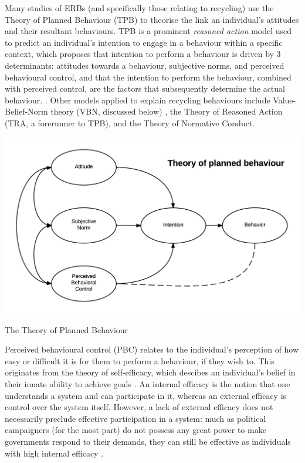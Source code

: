 \documentclass[nofonts,nols,justified,nobib]{tufte-book}
\begin{document}
Many studies of ERBs (and specifically those relating to recycling) use the Theory of Planned Behaviour (TPB) to theorise the link an individual's attitudes and their resultant behaviours. TPB is a prominent \emph{reasoned action} model used to predict an individual's intention to engage in a behaviour within a specific context, which proposes that intention to perform a behaviour is driven by 3 determinants: attitudes towards a behaviour, subjective norms, and perceived behavioural control, and that the intention to perform the behaviour, combined with perceived control, are the factors that subsequently determine the actual behaviour. \cite{ajzen_theory_1991}. Other models applied to explain recycling behaviours include Value-Belief-Norm theory (VBN, discussed below) \cite{huffman_when_2014}, the Theory of Reasoned Action (TRA, a forerunner to TPB), and the Theory of Normative Conduct.

\begin{marginfigure}
\includegraphics[width=\textwidth]{img/1/tpb.png}
\caption{The Theory of Planned Behaviour \cite{ajzen_theory_1991}}
\end{marginfigure}

Perceived behavioural control (PBC) relates to the individual's perception of how easy or difficult it is for them to perform a behaviour, if they wish to. This originates from the theory of self-efficacy, which descibes an individual's belief in their innate ability to achieve goals \cite{bandura_self-efficacy_1982}. An internal efficacy is the notion that one understands a system and can participate in it, whereas an external efficacy is control over the system itself. However, a lack of external efficacy does not necessarily preclude effective participation in a system: much as political campaigners (for the most part) do not possess any great power to make governments respond to their demands, they can still be effective as individuals with high internal efficacy \cite{zuckerman_mobilizing_2019}.
\end{document}
